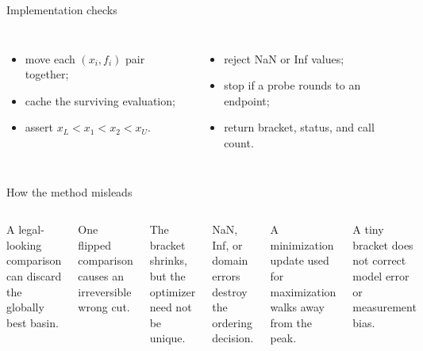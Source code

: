 \documentclass[aspectratio=169,11pt,t]{beamer}
\begin{document}
\begin{frame}{Implementation checks}
  \begin{columns}[T,onlytextwidth]
      \raggedright
      \begin{itemize}
        \item move each \((x_i,f_i)\) pair together;
        \item cache the surviving evaluation;
        \item assert \(x_L<x_1<x_2<x_U\).
      \end{itemize}

      \raggedright
      \begin{itemize}
        \item reject NaN or Inf values;
        \item stop if a probe rounds to an endpoint;
        \item return bracket, status, and call count.
      \end{itemize}
  \end{columns}

  \vspace{0.18cm}
\end{frame}

\begin{frame}{How the method misleads}
  \begin{columns}[T,onlytextwidth]

      A legal-looking comparison can discard the globally best basin.

      \vspace{0.22cm}

      One flipped comparison causes an irreversible wrong cut.

      \vspace{0.22cm}

      The bracket shrinks, but the optimizer need not be unique.


      NaN, Inf, or domain errors destroy the ordering decision.

      \vspace{0.22cm}

      A minimization update used for maximization walks away from the peak.

      \vspace{0.22cm}

      A tiny bracket does not correct model error or measurement bias.
  \end{columns}
\end{frame}
\end{document}
